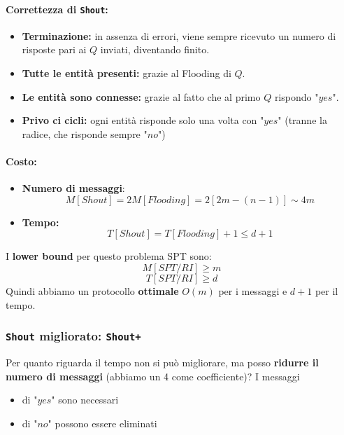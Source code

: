 \paragraph{Correttezza di \texttt{Shout}:}
\begin{itemize}
	\item \textbf{Terminazione:} in assenza di errori, viene sempre ricevuto un numero di risposte pari ai $Q$ inviati, diventando finito.\\
	
	\item \textbf{Tutte le entità presenti:} grazie al Flooding di $Q$.\\
	
	\item \textbf{Le entità sono connesse:} grazie al fatto che al primo $Q$ rispondo "$yes$".\\
	
	\item \textbf{Privo ci cicli:} ogni entità risponde solo una volta con "$yes$" (tranne la radice, che risponde sempre "$no$")
\end{itemize}

\paragraph{Costo:}
\begin{itemize}
	\item \textbf{Numero di messaggi}: 
	$$ M[Shout] = 2M[Flooding] = 2[2m - (n-1)] \sim 4m $$
	
	\item \textbf{Tempo:}
	$$ T[Shout] = T[Flooding] + 1 \leq d + 1 $$
\end{itemize}

I \textbf{lower bound} per questo problema SPT sono: 
$$ M[SPT/RI] \geq m $$
$$ T[SPT/RI] \geq d $$
Quindi abbiamo un protocollo \textbf{ottimale} $O(m)$ per i messaggi e $d+1$ per il tempo.\\

\newpage

\subsubsection{\texttt{Shout} migliorato: \texttt{Shout+}}

Per quanto riguarda il tempo non si può migliorare, ma posso \textbf{ridurre il numero di messaggi} (abbiamo un 4 come coefficiente)? I messaggi
\begin{itemize}
	\item di "$yes$" sono necessari
	\item di "$no$" possono essere eliminati
\end{itemize}

